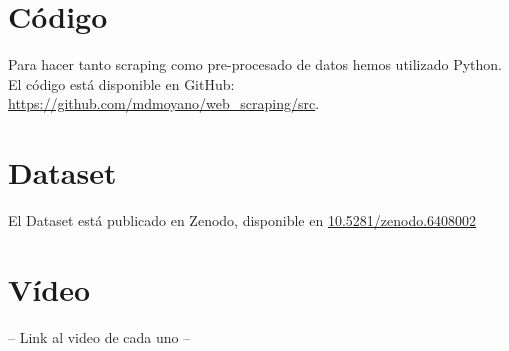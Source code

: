 \documentclass[IB]{PlantillaPACnova_Est}
\begin{document}
\section{Código}

Para hacer tanto scraping como pre-procesado de datos hemos utilizado Python. El código está disponible en GitHub: \url{https://github.com/mdmoyano/web_scraping/src}.

\section{Dataset}

El Dataset está publicado en Zenodo, disponible en  \url{10.5281/zenodo.6408002}


\section{Vídeo}

-- Link al video de cada uno --



%
%
\newpage

 
\listoffigures
\end{document}
